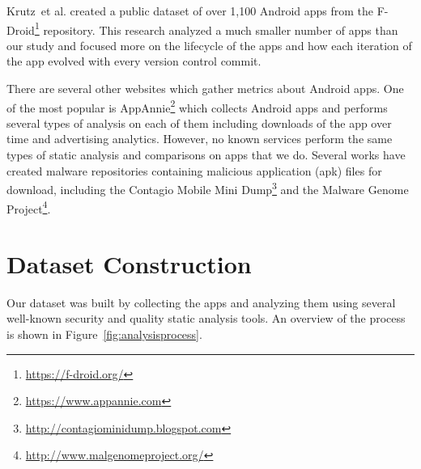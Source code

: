 \documentclass{sig-alternate-05-2015}
\newcommand{\todo}[1]{\textcolor{cyan}{\textbf{[#1]}}}
\begin{document}
Krutz~et al.\cite{krutz2015FDroid} created a public dataset of over 1,100 Android apps from the F-Droid\footnote{\url{https://f-droid.org/}} repository. This research analyzed a much smaller number of apps than our study and focused more on the lifecycle of the apps and how each iteration of the app evolved with every version control commit.




There are several other websites which gather metrics about Android apps. One of the most popular is AppAnnie\footnote{\url{https://www.appannie.com}} which collects Android apps and performs several types of analysis on each of them including downloads of the app over time and advertising analytics. However, no known services perform the same types of static analysis and comparisons on apps that we do. Several works have created malware repositories containing malicious application (apk) files for download, including the Contagio Mobile Mini Dump\footnote{\url{http://contagiominidump.blogspot.com}} and the Malware Genome Project\footnote{\url{http://www.malgenomeproject.org/}}.










\section{Dataset Construction}
\label{sec: datasetconstruction}

Our dataset was built by collecting the apps and analyzing them using several well-known security and quality static analysis tools. An overview of the process is shown in Figure~\ref{fig:analysisprocess}.
\end{document}

